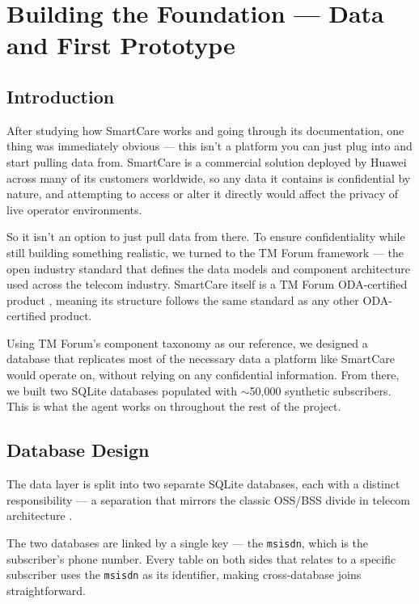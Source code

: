 \chapter{Building the Foundation — Data and First Prototype}\label{chapter:BF-DFP}


\section*{Introduction}
After studying how SmartCare works and going through its documentation, one thing was immediately obvious --- this isn't a platform you can just plug into and start pulling data from. 
SmartCare is a commercial solution deployed by Huawei across many of its
customers worldwide, so any data it contains is confidential by nature, and
attempting to access or alter it directly would affect the privacy of live
operator environments. 

So it isn't an option to just pull data from there. To
ensure confidentiality while still building something realistic, we turned to
the TM Forum framework --- the open industry standard that defines the data
models and component architecture used across the telecom industry. SmartCare
itself is a TM Forum ODA-certified product \cite{huawei_tmforum}, meaning its
structure follows the same standard as any other ODA-certified product.

Using TM Forum's component taxonomy \cite{tmforum_sid} as our reference, we designed
a database that replicates most of the necessary data a platform like SmartCare
would operate on, without relying on any confidential information. From there,
we built two SQLite databases populated with \(\sim\)50{,}000 synthetic
subscribers. This is what the agent works on throughout the rest of the project.
\section{Database Design}\label{sec:db-design}

The data layer is split into two separate SQLite databases, each with a distinct
 responsibility --- a separation that mirrors the classic OSS/BSS divide in telecom 
 architecture \cite{tmforum_sid}.

The two databases are linked by a single key --- the \texttt{msisdn}, which is 
the subscriber's phone number. Every table on both sides that relates to a specific
subscriber uses the \texttt{msisdn} as its identifier, making cross-database joins
straightforward. 

